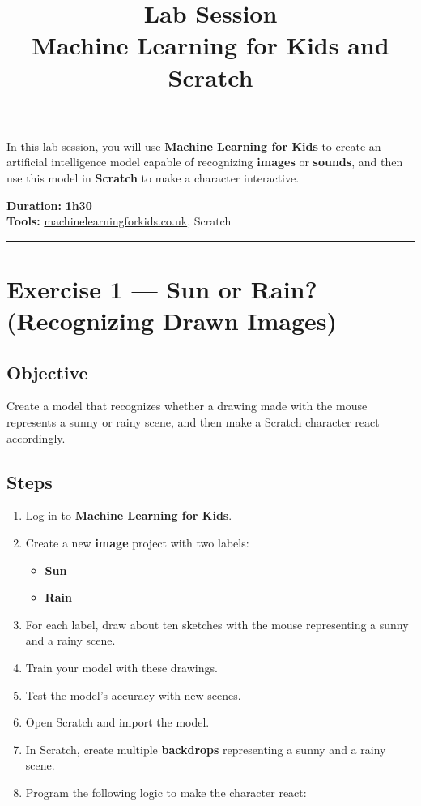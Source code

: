 \documentclass[12pt,a4paper]{article}
\title{\Huge \textbf{Lab Session} \\[0.3em]
\Large Machine Learning for Kids and Scratch \\[0.5em]
}
\author{}
\date{}
\begin{document}
\maketitle

\begin{tcolorbox}[colback=gray!5,colframe=gray!50!black,title=General Objective,fonttitle=\bfseries]
In this lab session, you will use \textbf{Machine Learning for Kids} to create an artificial intelligence model capable of recognizing \textbf{images} or \textbf{sounds}, and then use this model in \textbf{Scratch} to make a character interactive.  

\vspace{0.3cm}
\noindent\textbf{Duration:} \textbf{1h30} \\
\textbf{Tools:} \href{https://machinelearningforkids.co.uk/}{machinelearningforkids.co.uk}, Scratch
\end{tcolorbox}

\noindent\rule{\linewidth}{0.4pt}

\section*{Exercise 1 — Sun or Rain? (Recognizing Drawn Images)}

\subsection*{Objective}
Create a model that recognizes whether a drawing made with the mouse represents a sunny or rainy scene, and then make a Scratch character react accordingly.

\subsection*{Steps}

\begin{enumerate}[label=\textbf{\arabic*.}, leftmargin=2em, itemsep=6pt]
    \item Log in to \textbf{Machine Learning for Kids}.
    \item Create a new \textbf{image} project with two labels:
    \begin{itemize}[leftmargin=*, label=--]
        \item \textbf{Sun}
        \item \textbf{Rain}
    \end{itemize}
    \item For each label, draw about ten sketches with the mouse representing a sunny and a rainy scene.
    \item Train your model with these drawings.
    \item Test the model’s accuracy with new scenes.
    \item Open Scratch and import the model.
    \item In Scratch, create multiple \textbf{backdrops} representing a sunny and a rainy scene.
    \item Program the following logic to make the character react:
\end{enumerate}
\end{document}
